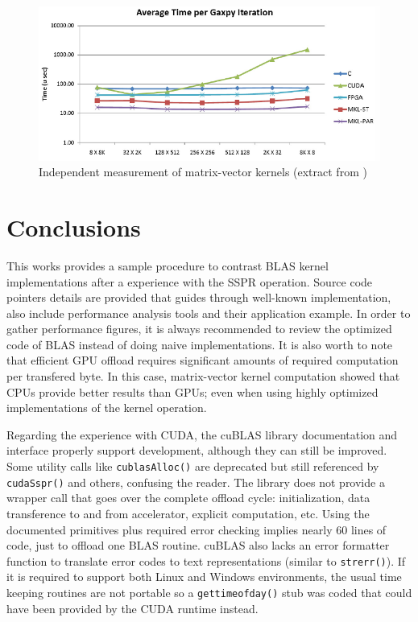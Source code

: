 \documentclass{llncs}
\begin{document}
\begin{figure}[H]
\begin{center}
\includegraphics[width=12cm]{gaxpy.png}
\caption{Independent measurement of matrix-vector kernels (extract from \cite{ms-gaxpy})}
\label{fig:gaxpy}
\end{center}
\end{figure}

\section{Conclusions}

This works provides a sample procedure to contrast BLAS kernel implementations after a experience with the SSPR operation. Source code pointers details are provided that guides through well-known implementation, also include performance analysis tools and their application example. In order to gather performance figures, it is always recommended to review the optimized code of BLAS instead of doing naive implementations. It is also worth to note that efficient GPU offload requires significant amounts of required computation per transfered byte. In this case, matrix-vector kernel computation showed that CPUs provide better results than GPUs; even when using highly optimized implementations of the kernel operation.

\smallskip

Regarding the experience with CUDA, the cuBLAS library documentation and interface properly support
development, although they can still be improved. Some utility calls like {\tt cublasAlloc()} are deprecated
but still referenced by {\tt cudaSspr()} and others, confusing the reader. The library does not provide a wrapper
call that goes over the complete offload cycle: initialization, data transference to and from accelerator,
explicit computation, etc. Using the documented primitives plus required error checking implies nearly 60
lines of code, just to offload one BLAS routine. cuBLAS also lacks an error formatter function to translate error
codes to text representations (similar to {\tt strerr()}). If it is required to support both Linux and Windows
environments, the usual time keeping routines are not portable so a {\tt gettimeofday()} stub was coded that
could have been provided by the CUDA runtime instead.
\end{document}
